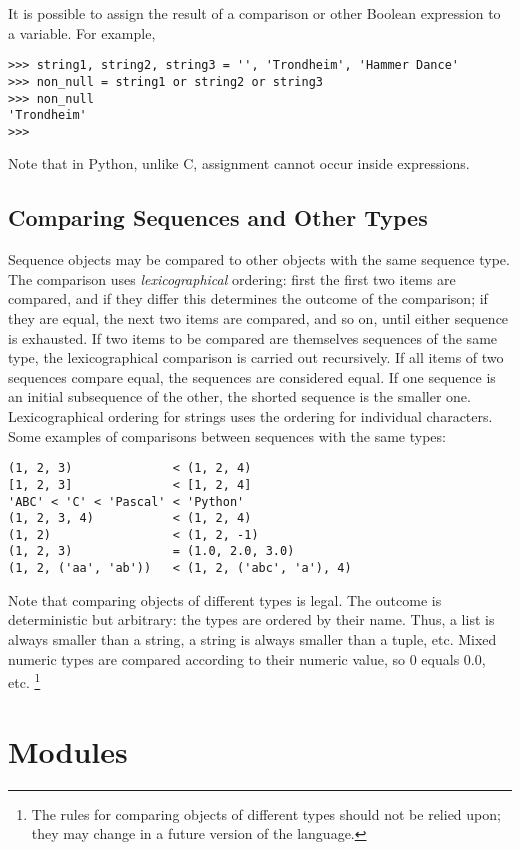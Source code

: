 It is possible to assign the result of a comparison or other Boolean
expression to a variable.  For example,

\bcode\begin{verbatim}
>>> string1, string2, string3 = '', 'Trondheim', 'Hammer Dance'
>>> non_null = string1 or string2 or string3
>>> non_null
'Trondheim'
>>> 
\end{verbatim}\ecode
%
Note that in Python, unlike C, assignment cannot occur inside expressions.

\section{Comparing Sequences and Other Types}

Sequence objects may be compared to other objects with the same
sequence type.  The comparison uses {\em lexicographical} ordering:
first the first two items are compared, and if they differ this
determines the outcome of the comparison; if they are equal, the next
two items are compared, and so on, until either sequence is exhausted.
If two items to be compared are themselves sequences of the same type,
the lexicographical comparison is carried out recursively.  If all
items of two sequences compare equal, the sequences are considered
equal.  If one sequence is an initial subsequence of the other, the
shorted sequence is the smaller one.  Lexicographical ordering for
strings uses the \ASCII{} ordering for individual characters.  Some
examples of comparisons between sequences with the same types:

\bcode\begin{verbatim}
(1, 2, 3)              < (1, 2, 4)
[1, 2, 3]              < [1, 2, 4]
'ABC' < 'C' < 'Pascal' < 'Python'
(1, 2, 3, 4)           < (1, 2, 4)
(1, 2)                 < (1, 2, -1)
(1, 2, 3)              = (1.0, 2.0, 3.0)
(1, 2, ('aa', 'ab'))   < (1, 2, ('abc', 'a'), 4)
\end{verbatim}\ecode
%
Note that comparing objects of different types is legal.  The outcome
is deterministic but arbitrary: the types are ordered by their name.
Thus, a list is always smaller than a string, a string is always
smaller than a tuple, etc.  Mixed numeric types are compared according
to their numeric value, so 0 equals 0.0, etc.%
\footnote{
        The rules for comparing objects of different types should
        not be relied upon; they may change in a future version of
        the language.
}


\chapter{Modules}

